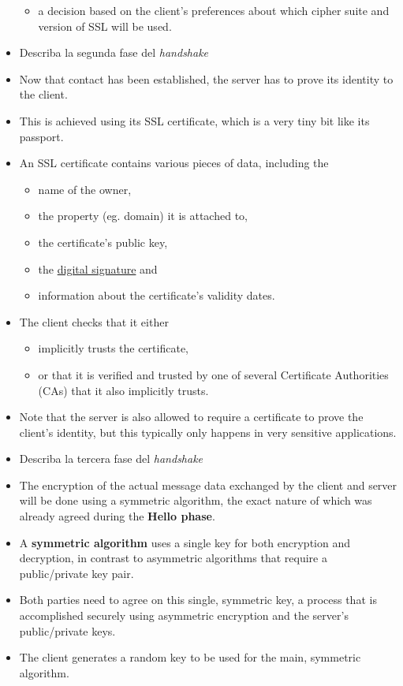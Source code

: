 \begin{itemize}
  \begin{itemize}
  \itemsep1pt\parskip0pt
  \item
    a decision based on the client's preferences about which cipher
    suite and version of SSL will be used.
  \end{itemize}
\item
  Describa la segunda fase del \emph{handshake}
\item
  Now that contact has been established, the server has to prove its
  identity to the client.
\item
  This is achieved using its SSL certificate, which is a very tiny bit
  like its passport.
\item
  An SSL certificate contains various pieces of data, including the

  \begin{itemize}
  \itemsep1pt\parskip0pt
  \item
    name of the owner,
  \item
    the property (eg. domain) it is attached to,
  \item
    the certificate's public key,
  \item
    the \href{https://en.wikipedia.org/wiki/Digital_signature}{digital
    signature} and
  \item
    information about the certificate's validity dates.
  \end{itemize}
\item
  The client checks that it either

  \begin{itemize}
  \itemsep1pt\parskip0pt
  \item
    implicitly trusts the certificate,
  \item
    or that it is verified and trusted by one of several Certificate
    Authorities (CAs) that it also implicitly trusts.
  \end{itemize}
\item
  Note that the server is also allowed to require a certificate to prove
  the client's identity, but this typically only happens in very
  sensitive applications.
\item
  Describa la tercera fase del \emph{handshake}
\item
  The encryption of the actual message data exchanged by the client and
  server will be done using a symmetric algorithm, the exact nature of
  which was already agreed during the \textbf{Hello phase}.
\item
  A \textbf{symmetric algorithm} uses a single key for both encryption
  and decryption, in contrast to asymmetric algorithms that require a
  public/private key pair.
\item
  Both parties need to agree on this single, symmetric key, a process
  that is accomplished securely using asymmetric encryption and the
  server's public/private keys.
\item
  The client generates a random key to be used for the main, symmetric
  algorithm.


\end{itemize}
